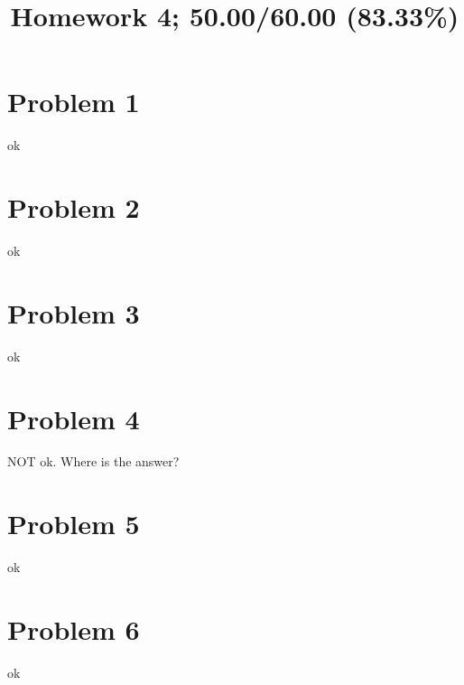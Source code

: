 \documentclass[10pt]{article} %
\title{Homework 4;
50.00/60.00 (83.33\%)
}
\begin{document}
\maketitle

\section*{Problem 1 }
ok
\section*{Problem 2 }
ok
\section*{Problem 3 }
ok
\section*{Problem 4 }
NOT ok. Where is the answer?
\section*{Problem 5 }
ok
\section*{Problem 6 }
ok
\end{document}
